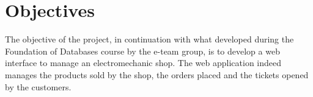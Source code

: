 \section{Objectives}


The objective of the project, in continuation with what developed during the Foundation of
Databases course by the e-team group, is to develop a web interface to manage an electromechanic shop. The web application indeed manages the products sold by the shop, the orders placed and the tickets opened by the customers.